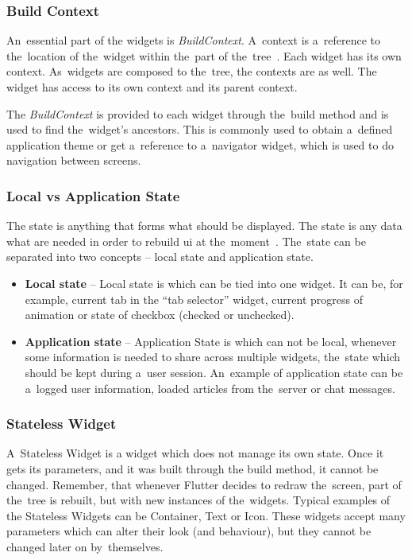 \subsubsection{Build Context}
An~essential part of the widgets is \textit{BuildContext}. A~context is a~reference to the~location of the~widget within the~part of the~tree~\cite{notion-widget-didier}. Each widget has its own context. As~widgets are composed to the~tree, the contexts are as well. The widget has access to its own context and its parent context. 

The \textit{BuildContext} is provided to each widget through the~build method and is used to find the~widget's ancestors.  This is commonly used to obtain a~defined application theme or get a~reference to a~navigator widget, which is used to do navigation between screens. 
\subsubsection{Local vs Application State}
The state is anything that forms what should be displayed. The state is any data what are needed in order to rebuild \gls{ui} at the~moment~\cite{flutter-local-app-state}. The~state can be separated into two concepts -- local state and application state. 

\begin{itemize}
    \item \textbf{Local state} -- Local state is which can be tied into one widget. It can be, for example, current tab in the ``tab selector'' widget, current progress of animation or state of checkbox (checked or unchecked).
    \item \textbf{Application state} -- Application State is which can not be local, whenever some information is needed to share across multiple widgets, the~state which should be kept during a~user session. An~example of application state can be a~logged user information, loaded articles from the~server or chat messages.
\end{itemize}
\subsubsection{Stateless Widget}
A~Stateless Widget is a widget which does not manage its own state. Once it gets its parameters, and it was built through the build method, it cannot be changed. Remember, that whenever Flutter decides to redraw the~screen, part of the~tree is rebuilt, but with new instances of the~widgets. Typical examples of the Stateless Widgets can be Container, Text or Icon. These widgets accept many parameters which can alter their look (and behaviour), but they cannot be changed later on by~themselves. 
